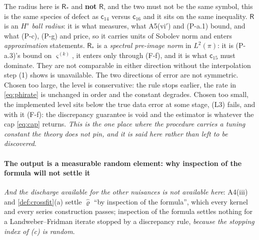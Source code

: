 The radius here is $\mathsf R_\ast$ and \textbf{not} $\mathsf R$, and the two must not be the same
symbol, this is the same species of defect as $\mathsf c_{14}$ versus $\mathsf c_{16}$ and it sits on
the same inequality. $\mathsf R$ is an \emph{$H^{s}$ ball radius}: it is what 
measures, what A5(vi$'$) and (P-a.1) bound, and what (P-c), (P-g) and  price, so it
carries units of Sobolev norm and enters \emph{approximation} statements. $\mathsf R_\ast$ is a
\emph{spectral pre-image norm} in $L^{2}(\pi)$: it is (P-a.3)'s bound on $\varsigma^{(k)}$, it enters
only through (F-f), and it is what $\mathsf c_{15}$ must dominate. They are not comparable in
either direction without the interpolation step \textup{(1)} shows is unavailable.
The two directions of error are not symmetric. Chosen too large, the level is
conservative: the rule stops earlier, the rate in \eqref{eq:phirate} is unchanged in order and the
constant degrades. Chosen too small, the implemented level sits below the true data error
at some stage, (L3) fails, and with it (F-f): the discrepancy guarantee is void and the estimator is
whatever the cap \eqref{eq:cap} returns. \emph{This is the one place where the procedure carries a tuning constant the
theory does not pin, and it is said here rather than left to be discovered}.

\paragraph{The output is a measurable random element: why inspection of the formula will not settle it}

\emph{And the discharge
available for the other nuisances is not available here}: A4(iii) and \cref{def:crossfit}\textup{(a)} settle
$\hat\varrho$ ``by inspection of the formula'', which every kernel and every series construction passes;
inspection of the formula settles nothing for a Landweber--Fridman iterate stopped by a discrepancy rule,
\emph{because the stopping index of \textup{(c)} is random}.

